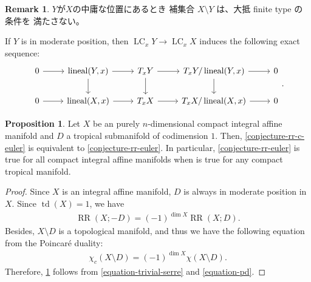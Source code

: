 \documentclass[a4paper,dvipdfmx,reqno,12pt]{amsart}
\theoremstyle{definition}
\newtheorem{proposition}[theorem]{Proposition}
\newtheorem{remark}[theorem]{Remark}
\newcommand{\opn}[1]{\operatorname{#1}}
\numberwithin{equation}{section}
\begin{document}
\begin{remark}
$Y$が$X$の中庸な位置にあるとき
補集合 $X\setminus Y$ は、大抵 finite type の条件を
満たさない。
\end{remark}

If $Y$ is in moderate position, then 
$\opn{LC}_x Y\to \opn{LC}_x X$ induces the following 
exact sequence:
\[\begin{tikzcd}
	0 & {\opn{lineal}(Y,x)} & {T_x Y} & {T_x Y/\opn{lineal}(Y,x)} & 0 \\
	0 & {\opn{lineal}(X,x)} & {T_x X} & 
{T_x X/\opn{lineal}(X,x)} & 0
	\arrow[from=1-1, to=1-2]
	\arrow[from=2-1, to=2-2]
	\arrow[from=2-3, to=2-4]
	\arrow[from=1-3, to=1-4]
	\arrow[from=1-4, to=2-4]
	\arrow[from=1-2, to=2-2]
	\arrow[from=1-2, to=1-3]
	\arrow[from=2-2, to=2-3]
	\arrow[from=1-3, to=2-3]
	\arrow[from=2-4, to=2-5]
	\arrow[from=1-4, to=1-5]
\end{tikzcd}.\]



\begin{proposition}
\label{proposition-divisor-poincare}
Let $X$ be an purely 
$n$-dimensional compact integral
affine manifold and $D$ a tropical submanifold 
of codimension $1$.
Then, \cref{conjecture-rr-c-euler} is 
equivalent to
\cref{conjecture-rr-euler}. In particular,
\cref{conjecture-rr-euler} is true for
all compact integral affine manifolds when
\cite[Conjecture 6.13]{demedrano2023chern} is
true for any compact tropical manifold.
\end{proposition}
\begin{proof}
Since $X$ is an integral affine manifold,
$D$ is always in moderate position in $X$.
Since $\opn{td}(X)=1$, we have
\begin{align}
\label{equation-trivial-serre}
\opn{RR}(X;-D)=(-1)^{\dim X}\opn{RR}(X;D).
\end{align}
Besides, $X\setminus D$ is a topological manifold, 
and thus we have the following equation from 
the Poincar\'e duality:
\begin{align}
\label{equation-pd}
\chi_c(X\setminus D)=(-1)^{\dim X}\chi(X\setminus D).
\end{align}
Therefore, \cref{proposition-divisor-poincare} follows from
\cref{equation-trivial-serre} and
\cref{equation-pd}.
\end{proof}
\end{document}
